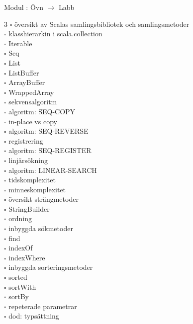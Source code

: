 
    Modul : Övn  $\rightarrow$ Labb 
    \begin{multicols}{3}\SlideFontTiny
    $\square$ översikt av Scalas samlingsbibliotek och samlingsmetoder \\
$\square$ klasshierarkin i scala.collection \\
$\square$ Iterable \\
$\square$ Seq \\
$\square$ List \\
$\square$ ListBuffer \\
$\square$ ArrayBuffer \\
$\square$ WrappedArray \\
$\square$ sekvensalgoritm \\
$\square$ algoritm: SEQ-COPY \\
$\square$ in-place vs copy \\
$\square$ algoritm: SEQ-REVERSE \\
$\square$ registrering \\
$\square$ algoritm: SEQ-REGISTER \\
$\square$ linjärsökning \\
$\square$ algoritm: LINEAR-SEARCH \\
$\square$ tidskomplexitet \\
$\square$ minneskomplexitet \\
$\square$ översikt strängmetoder \\
$\square$ StringBuilder \\
$\square$ ordning \\
$\square$ inbyggda sökmetoder \\
$\square$ find \\
$\square$ indexOf \\
$\square$ indexWhere \\
$\square$ inbyggda sorteringsmetoder \\
$\square$ sorted \\
$\square$ sortWith \\
$\square$ sortBy \\
$\square$ repeterade parametrar \\
$\square$ dod: typsättning \\
    \end{multicols}
    
